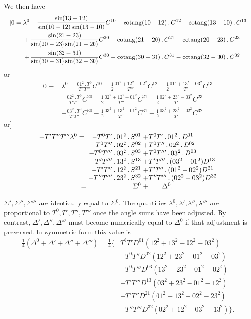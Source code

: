 We then have
\[
\resizebox{\linewidth}{!}{\(\begin{aligned}
 {[}0={}&\lambda^0+\frac{\sin(13-12)}{\sin(10-12)\sin(13-10)}C^{10}
 -\operatorname{cotang}(10-12)\,.\,C^{12}
 -\operatorname{cotang}(13-10)\,.\,C^{13}\\
 &+\frac{\sin(21-23)}{\sin(20-23)\sin(21-20)}C^{20}
 -\operatorname{cotang}(21-20)\,.\,C^{21}
 -\operatorname{cotang}(20-23)\,.\,C^{23}\\
 &+\frac{\sin(32-31)}{\sin(30-31)\sin(32-30)}C^{30}
 -\operatorname{cotang}(30-31)\,.\,C^{31}
 -\operatorname{cotang}(32-30)\,.\,C^{32}
\end{aligned}\)}
\]
\noindent or
\[
\begin{aligned}
 0={}&\lambda^0-\frac{01^2\,.\,T^0}{T''T'''}C^{10}
 -\tfrac12\frac{01^2+12^2-02^2}{T'''}C^{12}
 -\tfrac12\frac{01^2+13^2-03^2}{T''}C^{13}\\
 &-\frac{02^2\,.\,T^0}{T'T'''}C^{20}
 -\tfrac12\frac{02^2+12^2-01^2}{T'''}C^{21}
 -\tfrac12\frac{02^2+23^2-03^2}{T'}C^{23}\\
 &-\frac{03^2\,.\,T^0}{T'T''}C^{30}
 -\tfrac12\frac{03^2+13^2-01^2}{T''}C^{31}
 -\tfrac12\frac{03^2+23^2-02^2}{T'}C^{32}
\end{aligned}
\]
\noindent or]
\[
\begin{array}{@{}r@{\;}r@{\;}l@{}}
 -T'T''T'''\lambda^0={}&-T^0T'\,.\,01^2\,.\,S^{01}&+T^0T'\,.\,01^2\,.\,D^{01}\\
 &-T^0T''\,.\,02^2\,.\,S^{02}&+T^0T''\,.\,02^2\,.\,D^{02}\\
 &-T^0T'''\,.\,03^2\,.\,S^{03}&+T^0T'''\,.\,03^2\,.\,D^{03}\\
 &-T'T'''\,.\,13^2\,.\,S^{13}&+T'T'''\,.\,(03^2-01^2)D^{13}\\
 &-T'T''\,.\,12^2\,.\,S^{21}&+T'T''\,.\,(01^2-02^2)D^{21}\\
 &-T''T'''\,.\,23^2\,.\,S^{32}&+T''T'''\,.\,(02^2-03^2)D^{32}\\
 =&\Sigma^0&+\qquad\Delta^0.
\end{array}
\]

\(\Sigma',\Sigma'',\Sigma'''\) are identically equal to \(\Sigma^0\). The quantities \(\lambda^0,\allowbreak \lambda',\allowbreak \lambda'',\allowbreak \lambda'''\) are proportional to \(T^0,\allowbreak T',\allowbreak T'',\allowbreak T'''\) once the angle sums have been adjusted. By contrast, \(\Delta',\Delta'',\Delta'''\) must become numerically equal to \(\Delta^0\) if that adjustment is preserved. In symmetric form this value is
\[
\begin{aligned}
 \tfrac14(\Delta^0+\Delta'+\Delta''+\Delta''')=\tfrac14\bigl\{&
 T^0T'D^{01}(12^2+13^2-02^2-03^2)\\
 &+T^0T''D^{02}(12^2+23^2-01^2-03^2)\\
 &+T^0T'''D^{03}(13^2+23^2-01^2-02^2)\\
 &+T'T'''D^{13}(03^2+23^2-01^2-12^2)\\
 &+T'T''D^{21}(01^2+13^2-02^2-23^2)\\
 &+T''T'''D^{32}(02^2+12^2-03^2-13^2)\bigr\}.
\end{aligned}
\]

